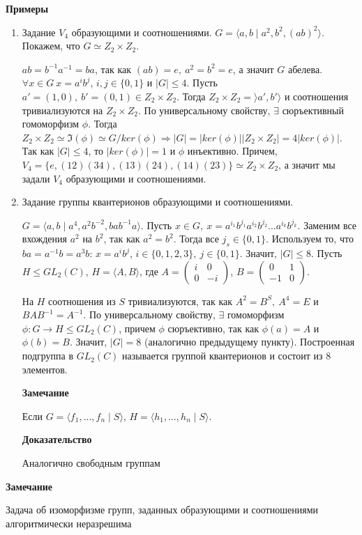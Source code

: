 \documentclass{article}
\begin{document}
\vspace{10pt}

\textbf{Примеры}
\begin{enumerate}
	\item Задание $V_4$ образующими и соотношениями. $G = \langle a, b \mid a^2, b^2, (ab)^2 \rangle$. Покажем, что $G \simeq Z_2 \times Z_2$.
	
	$ab = b^{-1}a^{-1} = ba$, так как $(ab) = e, \  a^2 = b^2 = e$, а значит $G$ абелева. $\forall x \in G \  x = a^ib^j$, $i, j \in \{0, 1\}$ и $|G| \leq 4$. Пусть $a' = (1, 0), \  b' = (0, 1) \in Z_2 \times Z_2$. Тогда $Z_2 \times Z_2 = \rangle a', b' \rangle$ и соотношения тривиализуются на $Z_2 \times Z_2$. По универсальному свойству, $\exists$ сюръективный гомоморфизм $\phi$. Тогда $Z_2 \times Z_2 \simeq \Im(\phi) \simeq G/ker(\phi) \Rightarrow |G| = |ker(\phi)||Z_2 \times Z_2| = 4|ker(\phi)|$. Так как $|G| \leq 4$, то $|ker(\phi)| = 1$ и $\phi$ инъективно. Причем, $V_4 = \{e, (1 2)(3 4), (1 3)(2 4), (1 4)(2 3)\} \simeq Z_2 \times Z_2$, а значит мы задали $V_4$ образующими и соотношениями.
	
	\item Задание группы квантерионов образующими и соотношениями.
	
	$G = \langle a, b \mid a^4, a^2b^{-2}, bab^{-1}a\rangle$. Пусть $x \in G, \  x = a^{i_1}b^{j_1}a^{i_2}b^{j_2}...a^{i_k}b^{j_k}$. Заменим все вхождения $a^2$ на $b^2$, так как $a^2 = b^2$. Тогда все $j_s \in \{0, 1\}$. Используем то, что $ba = a^{-1}b = a^3b$: $x = a^ib^j$, $i \in \{0, 1, 2, 3\}, \  j \in \{0, 1\}$. Значит, $|G| \leq 8$. Пусть $H \leq GL_2(C)$, $H = \langle A, B \rangle$, где $A = \begin{pmatrix}
i & 0 \\
0 & -i
\end{pmatrix}$, $B = \begin{pmatrix}
0 & 1 \\
-1 & 0
\end{pmatrix}$.

На $H$ соотношения из $S$ тривиализуются, так как $A^2 = B^S,\  A^4 = E$ и $BAB^{-1} = A^{-1}$. По универсальному свойству, $\exists$ гомоморфизм $\phi: G \rightarrow H \leq GL_2(C)$, причем $\phi$ сюръективно, так как $\phi(a) = A$ и $\phi(b) = B$. Значит, $|G|= 8$ (аналогично предыдущему пункту). Построенная подгруппа в $GL_2(C)$ называется группой квантерионов и состоит из $8$ элементов.

\vspace{10pt}

\textbf{Замечание}

Если $G = \langle f_1, ..., f_n \mid S \rangle$, $H = \langle h_1, ..., h_n \mid S \rangle$.

\textbf{Доказательство}

Аналогично свободным группам
\end{enumerate}

\vspace{10pt}

\textbf{Замечание}

Задача об изоморфизме групп, заданных образующими и соотношениями алгоритмически неразрешима
\end{document}

